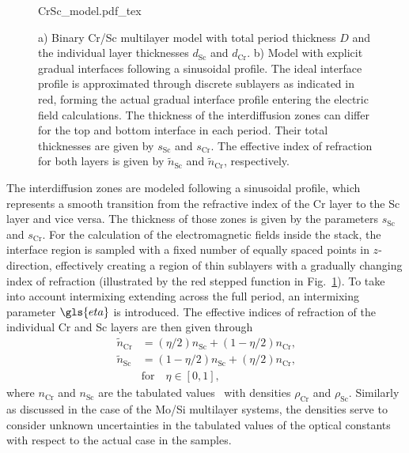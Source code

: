 \begin{figure}[htb]
    \def\svgwidth{\textwidth}
    {CrSc_model.pdf_tex}
    \caption[Binary and gradual Cr/Sc multilayer models.]{a) Binary Cr/Sc multilayer model with total period thickness $D$ and 
the individual layer thicknesses $d_\text{Sc}$ and $d_\text{Cr}$. b) Model with 
explicit gradual interfaces following a sinusoidal profile. The ideal interface 
profile is approximated through discrete sublayers as indicated in red, forming 
the actual gradual interface profile entering the electric field calculations. 
The thickness of the interdiffusion zones can differ for the top and bottom 
interface in each period. Their total thicknesses are given by $s_\text{Sc}$ 
and $s_\text{Cr}$. The effective index of refraction for both layers is given 
by $\tilde{n}_\text{Sc}$ and $\tilde{n}_\text{Cr}$, respectively.}
    \label{ch_spec:fig_CrScModel}
\end{figure}
The interdiffusion zones are modeled following a sinusoidal profile, which represents a smooth transition from the refractive index of the Cr layer to the Sc layer and vice versa. The thickness of those zones is given by the parameters $s_\text{Sc}$ and $s_\text{Cr}$. For the calculation of the electromagnetic fields inside the stack, the interface region is sampled with a fixed number of equally spaced points in $z$-direction, effectively creating a region of thin sublayers with a gradually changing index of refraction (illustrated by the red stepped function in Fig.~\ref{ch_spec:fig_CrScModel}). To take into account intermixing extending across the full period, an intermixing parameter $\gls{eta}$ is introduced. The effective indices of refraction of the individual Cr and Sc layers are then given through
\begin{align}
\tilde{n}_\text{Cr} &=(\eta/2) n_\text{Sc} + (1-\eta/2) n_\text{Cr} \text{,} 
\nonumber\\
\tilde{n}_\text{Sc} &=(1-\eta/2) n_\text{Sc} + (\eta/2) n_\text{Cr} \text{,} 
\label{eqn:effective_n} \\
&\text{for} \quad \eta \in [0,1] \text{,}\nonumber
\end{align}
where $n_\text{Cr}$ and $n_\text{Sc}$ are the tabulated values~\cite{henke_x-ray_1993} 
with densities $\rho_\text{Cr}$ and $\rho_\text{Sc}$. Similarly as discussed in the case of the Mo/Si multilayer systems, the densities serve to consider unknown uncertainties in the tabulated values of the optical constants with respect to the actual case in the samples.

